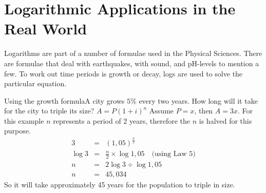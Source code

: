 

\section{Logarithmic Applications in the Real World}

Logarithms are part of a number of formulae used in the Physical Sciences.  There are formulae that deal with earthquakes, with sound, and pH-levels to mention a few.  To work out time periods is growth or decay, logs are used to solve the particular equation.

\begin{wex}{Using the growth formula}{A city grows $5\%$ every two years. How long will it take for the city to triple its size?}{
$A = P(1 + i)^n$
Assume $P = x$, then $A = 3x$.
For this example $n$ represents a period of 2 years, therefore the $n$ is halved for this purpose.
\begin{eqnarray*}
3 &=& (1,05)^{\frac{n}{2}}\\
\log{3} &=& \frac{n}{2} \times {\log{1,05}}\quad \mbox{(using Law 5)}\\
n &=& 2 \log{3} \div {\log{1,05}}\\
n &=& 45,034
\end{eqnarray*}
So it will take approximately 45 years for the population to triple in size.
}
\end{wex}


